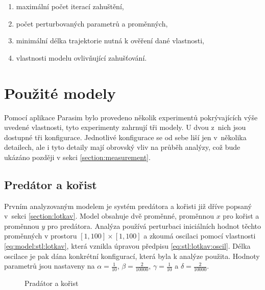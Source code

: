 \begin{enumerate}
	\item	maximální počet iterací zahuštění,
	\item	počet perturbovaných parametrů a proměnných,
	\item	minimální délka trajektorie nutná k ověření dané vlastnosti,
	\item	vlastnosti modelu ovlivňující zahušťování.
\end{enumerate}

\section{Použité modely}

Pomocí aplikace Parasim bylo provedeno několik experimentů po\-krý\-va\-jí\-cích výše uvedené vlastnosti, tyto experimenty
zahrnují tři modely. U dvou z~nich jsou dostupné tři konfigurace. Jednotlivé konfigurace se od sebe liší 
jen v~několika detailech, ale i tyto detaily mají obrovský vliv na průběh analýzy, což bude ukázáno později
v sekci \ref{section:measurement}.

\subsection{Predátor a kořist}

Prvním analyzovaným modelem je systém predátora a kořisti již dříve popsaný v~sek\-ci \ref{section:lotkav}. Model
obsahuje dvě proměnné, proměnnou $x$ pro kořist a pro\-měn\-nou $y$ pro predátora. Analýza používá
perturbaci iniciálních hodnot  těchto proměnných v prostoru $[1, 100] \times [1, 100]$ a zkoumá oscilaci pomocí vlastnosti \ref{eq:model:stl:lotkav},
která vznikla úpravou předpisu \ref{eq:stl:lotkav:oscil}. Délka oscilace je pak dána konkrétní konfigurací,
která byla k analýze použita. Hodnoty parametrů jsou nastaveny na $\alpha = \frac{1}{10}$,  $\beta = \frac{2}{10000}$, $\gamma = \frac{1}{10}$ a $\delta = \frac{2}{10000}$.

\begin{figure}[h!]
\begin{center}
\caption{Pradátor a kořist}
\end{center}
\end{figure}

